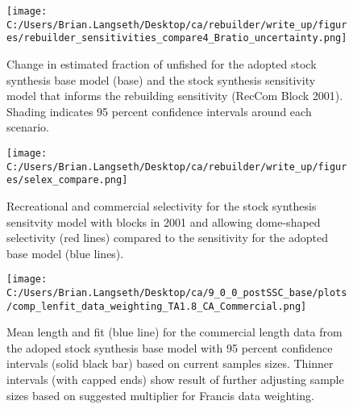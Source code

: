 \documentclass[11pt,
  english,
  a4paper,
]{article}
\begin{document}
\begin{figure}
\centering
\texttt{[image: C:/Users/Brian.Langseth/Desktop/ca/rebuilder/write\_up/figures/rebuilder\_sensitivities\_compare4\_Bratio\_uncertainty.png]}
\caption{Change in estimated fraction of unfished for the adopted stock synthesis base model (base) and the stock synthesis sensitivity model that informs the rebuilding sensitivity (RecCom Block 2001). Shading indicates 95 percent confidence intervals around each scenario.\label{fig:depl-sens}}
\end{figure}

\tagmcend\tagstructend


\begin{figure}
\centering
\texttt{[image: C:/Users/Brian.Langseth/Desktop/ca/rebuilder/write\_up/figures/selex\_compare.png]}
\caption{Recreational and commercial selectivity for the stock synthesis sensitvity model with blocks in 2001 and allowing dome-shaped selectivity (red lines) compared to the sensitivity for the adopted base model (blue lines).\label{fig:selex-sens}}
\end{figure}

\tagmcend\tagstructend


\begin{figure}
\centering
\texttt{[image: C:/Users/Brian.Langseth/Desktop/ca/9\_0\_0\_postSSC\_base/plots/comp\_lenfit\_data\_weighting\_TA1.8\_CA\_Commercial.png]}
\caption{Mean length and fit (blue line) for the commercial length data from the adoped stock synthesis base model with 95 percent confidence intervals (solid black bar) based on current samples sizes. Thinner intervals (with capped ends) show result of further adjusting sample sizes based on suggested multiplier for Francis data weighting.\label{fig:MeanLengthFit-base}}
\end{figure}
\end{document}
